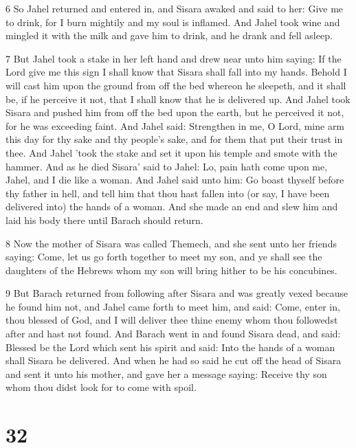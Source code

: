 \par 6 So Jahel returned and entered in, and Sisara awaked and said to her: Give me to drink, for I burn mightily and my soul is inflamed. And Jahel took wine and mingled it with the milk and gave him to drink, and he drank and fell asleep.

\par 7 But Jahel took a stake in her left hand and drew near unto him saying: If the Lord give me this sign I shall know that Sisara shall fall into my hands. Behold I will cast him upon the ground from off the bed whereon he sleepeth, and it shall be, if he perceive it not, that I shall know that he is delivered up. And Jahel took Sisara and pushed him from off the bed upon the earth, but he perceived it not, for he was exceeding faint. And Jahel said: Strengthen in me, O Lord, mine arm this day for thy sake and thy people's sake, and for them that put their trust in thee. And Jahel 'took the stake and set it upon his temple and smote with the hammer. And as he died Sisara' said to Jahel: Lo, pain hath come upon me, Jahel, and I die like a woman. And Jahel said unto him: Go boast thyself before thy father in hell, and tell him that thou hast fallen into (or say, I have been delivered into) the hands of a woman. And she made an end and slew him and laid his body there until Barach should return.

\par 8 Now the mother of Sisara was called Themech, and she sent unto her friends saying: Come, let us go forth together to meet my son, and ye shall see the daughters of the Hebrews whom my son will bring hither to be his concubines.

\par 9 But Barach returned from following after Sisara and was greatly vexed because he found him not, and Jahel came forth to meet him, and said: Come, enter in, thou blessed of God, and I will deliver thee thine enemy whom thou followedst after and hast not found. And Barach went in and found Sisara dead, and said: Blessed be the Lord which sent his spirit and said: Into the hands of a woman shall Sisara be delivered. And when he had so said he cut off the head of Sisara and sent it unto his mother, and gave her a message saying: Receive thy son whom thou didst look for to come with spoil.



\chapter{32}

